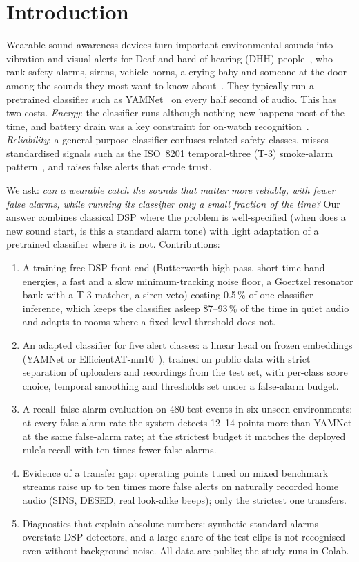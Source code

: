 \documentclass[conference]{IEEEtran}
\begin{document}
\section{Introduction}
Wearable sound-awareness devices turn important environmental sounds into vibration and visual alerts for Deaf and
hard-of-hearing (DHH) people~\cite{jain2020soundwatch}, who rank safety alarms, sirens, vehicle horns, a crying baby
and someone at the door among the sounds they most want to know about~\cite{findlater2019preferences}. They typically
run a pretrained classifier such as YAMNet~\cite{hershey2017cnn} on every half second of audio. This has two costs.
\emph{Energy}: the classifier runs although nothing new happens most of the time, and battery drain was a key
constraint for on-watch recognition~\cite{jain2020soundwatch}. \emph{Reliability}: a general-purpose classifier
confuses related safety classes, misses standardised signals such as the ISO~8201 temporal-three (T-3) smoke-alarm
pattern~\cite{iso8201}, and raises false alerts that erode trust.

We ask: \emph{can a wearable catch the sounds that matter more reliably, with fewer false alarms, while running its
classifier only a small fraction of the time?} Our answer combines classical DSP where the problem is
well-specified (when does a new sound start, is this a standard alarm tone) with light adaptation of a pretrained
classifier where it is not. Contributions:
\begin{enumerate}
\item A training-free DSP front end (Butterworth high-pass, short-time band energies, a fast and a slow
minimum-tracking noise floor, a Goertzel resonator bank with a T-3 matcher, a siren veto) costing 0.5\,\% of one
classifier inference, which keeps the classifier asleep 87--93\,\% of the time in quiet audio and adapts to rooms where
a fixed level threshold does not.
\item An adapted classifier for five alert classes: a linear head on frozen embeddings (YAMNet or
EfficientAT-mn10~\cite{schmid2023efficientat}), trained on public data with strict separation of uploaders and recordings
from the test set, with per-class score choice, temporal smoothing and thresholds set under a false-alarm budget.
\item A recall--false-alarm evaluation on 480 test events in six unseen environments: at every false-alarm rate the
system detects 12--14 points more than YAMNet at the same false-alarm rate; at the strictest budget it matches the deployed rule's recall with ten
times fewer false alarms.
\item Evidence of a transfer gap: operating points tuned on mixed benchmark streams raise up to ten times more false
alerts on naturally recorded home audio (SINS, DESED, real look-alike beeps); only the strictest one transfers.
\item Diagnostics that explain absolute numbers: synthetic standard alarms overstate DSP detectors, and a large share of
the test clips is not recognised even without background noise. All data are public; the study runs in Colab.
\end{enumerate}
\end{document}
